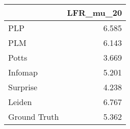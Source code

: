 \begin{tabular}{lr}
\toprule
{} & LFR_mu_20 \\
\midrule
PLP          &     6.585 \\
PLM          &     6.143 \\
Potts        &     3.669 \\
Infomap      &     5.201 \\
Surprise     &     4.238 \\
Leiden       &     6.767 \\
Ground Truth &     5.362 \\
\bottomrule
\end{tabular}
